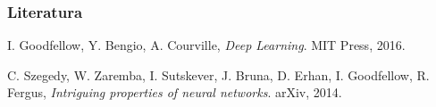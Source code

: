 \documentclass[czech]{beamer}
\begin{document}
\begin{frame}
    \frametitle{Literatura}
    \begin{thebibliography}{1}
        I. Goodfellow, Y. Bengio, A. Courville,
        \emph{Deep Learning}. MIT Press, 2016.


         C. Szegedy, W. Zaremba, I. Sutskever, J. Bruna, D. Erhan, I. Goodfellow, R. Fergus,
        \emph{Intriguing properties of neural networks}.
        arXiv, 2014.

    \end{thebibliography}
\end{frame}
\end{document}
